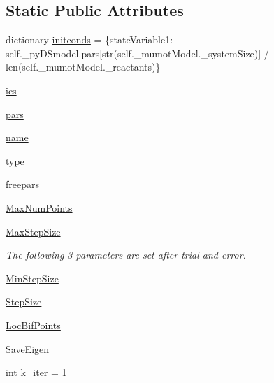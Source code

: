 \subsection*{Static Public Attributes}
\begin{DoxyCompactItemize}
\item 
dictionary \hyperlink{class_mu_mo_t_1_1_mu_mo_tbifurcation_view_a23ca095d6146b220be161f1f73017674}{initconds} = \{state\+Variable1\+: self.\+\_\+py\+D\+Smodel.\+pars\mbox{[}str(self.\+\_\+mumot\+Model.\+\_\+system\+Size)\mbox{]} / len(self.\+\_\+mumot\+Model.\+\_\+reactants)\}
\item 
\hyperlink{class_mu_mo_t_1_1_mu_mo_tbifurcation_view_a08c7b0edb053705a8c47fe487b6f53bd}{ics}
\item 
\hyperlink{class_mu_mo_t_1_1_mu_mo_tbifurcation_view_a372cc7d4f485e77e35668d40b507d0e5}{pars}
\item 
\hyperlink{class_mu_mo_t_1_1_mu_mo_tbifurcation_view_ab74e6bf80237ddc4109968cedc58c151}{name}
\item 
\hyperlink{class_mu_mo_t_1_1_mu_mo_tbifurcation_view_a7aead736a07eaf25623ad7bfa1f0ee2d}{type}
\item 
\hyperlink{class_mu_mo_t_1_1_mu_mo_tbifurcation_view_a15cf90b3888db001a8299a477d50af98}{freepars}
\item 
\hyperlink{class_mu_mo_t_1_1_mu_mo_tbifurcation_view_aaa677c130e36435865b68ff6230a932d}{Max\+Num\+Points}
\item 
\hyperlink{class_mu_mo_t_1_1_mu_mo_tbifurcation_view_a0a7557ffe670b6a318afa8bd9851d2fc}{Max\+Step\+Size}
\begin{DoxyCompactList}\small\item\em The following 3 parameters are set after trial-\/and-\/error. \end{DoxyCompactList}\item 
\hyperlink{class_mu_mo_t_1_1_mu_mo_tbifurcation_view_a5fe506ca005e76a55ccd505a36e17fe6}{Min\+Step\+Size}
\item 
\hyperlink{class_mu_mo_t_1_1_mu_mo_tbifurcation_view_a9c25479455e9bdd389f37c4bccfefea1}{Step\+Size}
\item 
\hyperlink{class_mu_mo_t_1_1_mu_mo_tbifurcation_view_a7ff5325c1fceeebd63c3e4805a2206c8}{Loc\+Bif\+Points}
\item 
\hyperlink{class_mu_mo_t_1_1_mu_mo_tbifurcation_view_a040a7ecbcbaca807aeaec6d5c81801d5}{Save\+Eigen}
\item 
int \hyperlink{class_mu_mo_t_1_1_mu_mo_tbifurcation_view_a9ef495f853c90bcdd0b87dafa9480956}{k\+\_\+iter} = 1

\end{DoxyCompactItemize}
